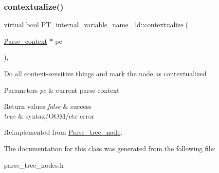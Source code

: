 \subsubsection{\texorpdfstring{contextualize()}{contextualize()}}
{\footnotesize\ttfamily virtual bool P\+T\+\_\+internal\+\_\+variable\+\_\+name\+\_\+1d\+::contextualize (\begin{DoxyParamCaption}\item[{\mbox{\hyperlink{structParse__context}{Parse\+\_\+context}} $\ast$}]{pc }\end{DoxyParamCaption})\hspace{0.3cm}{\ttfamily [inline]}, {\ttfamily [virtual]}}

Do all context-\/sensitive things and mark the node as contextualized


\begin{DoxyParams}{Parameters}
{\em pc} & current parse context\\
\hline
\end{DoxyParams}

\begin{DoxyRetVals}{Return values}
{\em false} & success \\
\hline
{\em true} & syntax/\+O\+O\+M/etc error \\
\hline
\end{DoxyRetVals}


Reimplemented from \mbox{\hyperlink{classParse__tree__node_a22d93524a537d0df652d7efa144f23da}{Parse\+\_\+tree\+\_\+node}}.



The documentation for this class was generated from the following file\+:\begin{DoxyCompactItemize}
\item 
parse\+\_\+tree\+\_\+nodes.\+h\end{DoxyCompactItemize}
